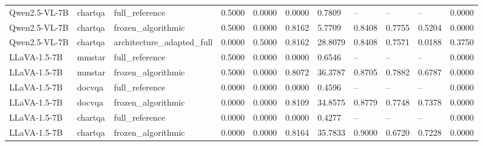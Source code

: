 \begin{tabular}{lllllllllll}
Qwen2.5-VL-7B & chartqa & full\_reference & 0.5000 & 0.0000 & 0.0000 & 0.7809 & -- & -- & -- & 0.0000 \\
Qwen2.5-VL-7B & chartqa & frozen\_algorithmic & 0.5000 & 0.0000 & 0.8162 & 5.7709 & 0.8408 & 0.7755 & 0.5204 & 0.0000 \\
Qwen2.5-VL-7B & chartqa & architecture\_adapted\_full & 0.0000 & 0.5000 & 0.8162 & 28.8079 & 0.8408 & 0.7571 & 0.0188 & 0.3750 \\
LLaVA-1.5-7B & mmstar & full\_reference & 0.5000 & 0.0000 & 0.0000 & 0.6546 & -- & -- & -- & 0.0000 \\
LLaVA-1.5-7B & mmstar & frozen\_algorithmic & 0.5000 & 0.0000 & 0.8072 & 36.3787 & 0.8705 & 0.7882 & 0.6787 & 0.0000 \\
LLaVA-1.5-7B & docvqa & full\_reference & 0.0000 & 0.0000 & 0.0000 & 0.4596 & -- & -- & -- & 0.0000 \\
LLaVA-1.5-7B & docvqa & frozen\_algorithmic & 0.0000 & 0.0000 & 0.8109 & 34.8575 & 0.8779 & 0.7748 & 0.7378 & 0.0000 \\
LLaVA-1.5-7B & chartqa & full\_reference & 0.0000 & 0.0000 & 0.0000 & 0.4277 & -- & -- & -- & 0.0000 \\
LLaVA-1.5-7B & chartqa & frozen\_algorithmic & 0.0000 & 0.0000 & 0.8164 & 35.7833 & 0.9000 & 0.6720 & 0.7228 & 0.0000 \\
\bottomrule
\end{tabular}
